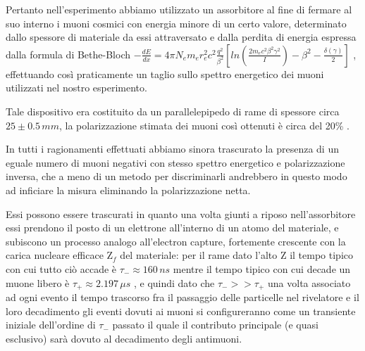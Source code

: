  \par
Pertanto nell'esperimento abbiamo utilizzato un assorbitore al fine di fermare al suo interno i muoni cosmici con energia minore di un certo valore, determinato dallo spessore di materiale da essi attraversato e dalla perdita di energia espressa dalla formula di Bethe-Bloch $-\frac{dE}{dx}=4\pi N_e m_e r_e^2 c^2 \frac{q^2}{\beta^2}[ln(\frac{2m_e c^2 \beta^2 \gamma^2}{I})-\beta^2-\frac{\delta(\gamma)}{2}]$ , effettuando così praticamente un taglio sullo spettro energetico dei muoni utilizzati nel nostro esperimento. \par
Tale dispositivo era costituito da un parallelepipedo di rame di spessore circa $25\pm0.5 \, mm$, la polarizzazione stimata dei muoni così ottenuti è circa del 20\% .\par
In tutti i ragionamenti effettuati abbiamo sinora trascurato la presenza di un eguale numero di muoni negativi con stesso spettro energetico e polarizzazione inversa, che a meno di un metodo per discriminarli andrebbero in questo modo ad inficiare la misura eliminando la polarizzazione netta. \par
Essi possono essere trascurati in quanto una volta giunti a riposo nell'assorbitore essi prendono il posto di un elettrone all'interno di un atomo del materiale, e subiscono un  processo analogo all'electron capture, fortemente crescente con la carica nucleare efficace Z$_f$ del materiale: per il rame dato l'alto Z il tempo tipico con cui tutto ciò accade è $\tau_-\approx 160 \, ns$ \cite{bib:Suzuki:1987jf} mentre il tempo tipico con cui decade un muone libero è $\tau_+\approx 2.197 \, \mu s$ \cite{bib:Patrignani:2016xqp}, e quindi dato che $\tau_->>\tau_+$ una volta associato ad ogni evento il tempo trascorso fra il passaggio delle particelle nel rivelatore e il loro decadimento gli eventi dovuti ai muoni si configureranno come un transiente iniziale dell'ordine di $\tau_-$ passato il quale il contributo principale (e quasi esclusivo) sarà dovuto al decadimento degli antimuoni. \par

